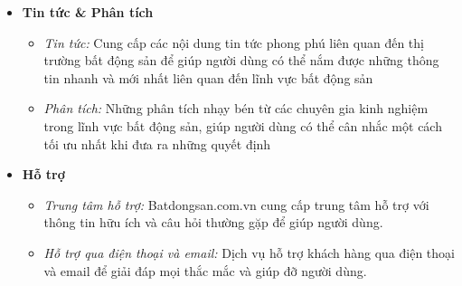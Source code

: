 \begin{itemize}
    \item \textbf{Tin tức \& Phân tích}
    \begin{itemize}
        \item \textit{Tin tức:} Cung cấp các nội dung tin tức phong phú liên quan đến thị trường bất động sản để giúp người dùng có thể nắm được những thông tin nhanh và mới nhất liên quan đến lĩnh vực bất động sản
        \item \textit{Phân tích:} Những phân tích nhạy bén từ các chuyên gia kinh nghiệm trong lĩnh vực bất động sản, giúp người dùng có thể cân nhắc một cách tối ưu nhất khi đưa ra những quyết định
    \end{itemize}
    \item \textbf{Hỗ trợ}
    \begin{itemize}
        \item \textit{Trung tâm hỗ trợ:} Batdongsan.com.vn cung cấp trung tâm hỗ trợ với thông tin hữu ích và câu hỏi thường gặp để giúp người dùng.
        \item \textit{Hỗ trợ qua điện thoại và email:} Dịch vụ hỗ trợ khách hàng qua điện thoại và email để giải đáp mọi thắc mắc và giúp đỡ người dùng.
    \end{itemize}
\end{itemize}
